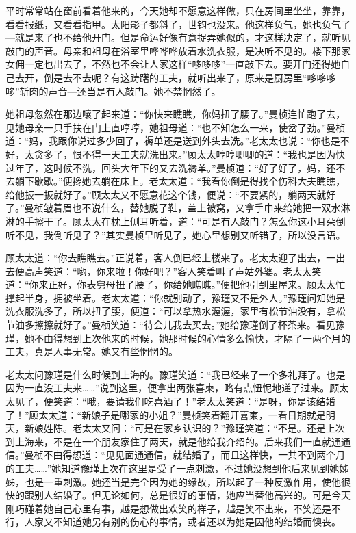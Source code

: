 \par 平时常常站在窗前看着他来的，今天她却不愿意这样做，只在房间里坐坐，靠靠，看看报纸，又看看指甲。太阳影子都斜了，世钧也没来。他这样负气，她也负气了—就是来了也不给他开门。但是命运好像有意捉弄她似的，才这样决定了，就听见敲门的声音。母亲和祖母在浴室里哗哗哗放着水洗衣服，是决听不见的。楼下那家女佣一定也出去了，不然也不会让人家这样“哆哆哆”一直敲下去。要开门还得她自己去开，倒是去不去呢？有这踌躇的工夫，就听出来了，原来是厨房里“哆哆哆哆”斩肉的声音—还当是有人敲门。她不禁惘然了。
\par 她祖母忽然在那边嚷了起来道：“你快来瞧瞧，你妈扭了腰了。”曼桢连忙跑了去，见她母亲一只手扶在门上直哼哼，她祖母道：“也不知怎么一来，使岔了劲。”曼桢道：“妈，我跟你说过多少回了，褥单还是送到外头去洗。”老太太也说：“你也是不好，太贪多了，恨不得一天工夫就洗出来。”顾太太哼哼唧唧的道：“我也是因为快过年了，这时候不洗，回头大年下的又去洗褥单。”曼桢道：“好了好了，妈，还不去躺下歇歇。”便搀她去躺在床上。老太太道：“我看你倒是得找个伤科大夫瞧瞧，给他扳一扳就好了。”顾太太又不愿意花这个钱，便说：“不要紧的，躺两天就好了。”曼桢皱着眉也不说什么，替她脱了鞋，盖上被窝，又拿手巾来给她把一双水淋淋的手擦干了。顾太太在枕上侧耳听着，道：“可是有人敲门？怎么你这小耳朵倒听不见，我倒听见了？”其实曼桢早听见了，她心里想别又听错了，所以没言语。
\par 顾太太道：“你去瞧瞧去。”正说着，客人倒已经上楼来了。老太太迎了出去，一出去便高声笑道：“哟，你来啦！你好吧？”客人笑着叫了声姑外婆。老太太笑道：“你来正好，你表舅母扭了腰了，你给她瞧瞧。”便把他引到里屋来。顾太太忙撑起半身，拥被坐着。老太太道：“你就别动了，豫瑾又不是外人。”豫瑾问知她是洗衣服洗多了，所以扭了腰，便道：“可以拿热水渥渥，家里有松节油没有，拿松节油多擦擦就好了。”曼桢笑道：“待会儿我去买去。”她给豫瑾倒了杯茶来。看见豫瑾，她不由得想到上次他来的时候，她那时候的心情多么愉快，才隔了一两个月的工夫，真是人事无常。她又有些惘惘的。
\par 老太太问豫瑾是什么时候到上海的。豫瑾笑道：“我已经来了一个多礼拜了。也是因为一直没工夫来……”说到这里，便拿出两张喜柬，略有点忸怩地递了过来。顾太太见了，便笑道：“哦，要请我们吃喜酒了！”老太太笑道：“是呀，你是该结婚了！”顾太太道：“新娘子是哪家的小姐？”曼桢笑着翻开喜柬，一看日期就是明天，新娘姓陈。老太太又问：“可是在家乡认识的？”豫瑾笑道：“不是。还是上次到上海来，不是在一个朋友家住了两天，就是他给我介绍的。后来我们一直就通通信。”曼桢不由得想道：“见见面通通信，就结婚了，而且这样快，一共不到两个月的工夫……”她知道豫瑾上次在这里是受了一点刺激，不过她没想到他后来见到她姊姊，也是一重刺激。她还当是完全因为她的缘故，所以起了一种反激作用，使他很快的跟别人结婚了。但无论如何，总是很好的事情，她应当替他高兴的。可是今天刚巧碰着她自己心里有事，越是想做出欢笑的样子，越是笑不出来，不笑还是不行，人家又不知道她另有别的伤心的事情，或者还以为她是因他的结婚而懊丧。
